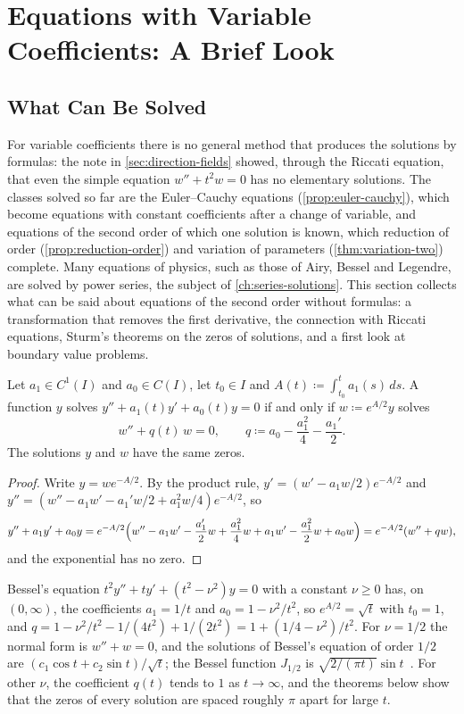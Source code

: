 \section{Equations with Variable Coefficients: A Brief Look}
\label{sec:variable-coefficients}

\subsection{What Can Be Solved}

For variable coefficients there is no general method that produces the solutions by formulas: the note in \cref{sec:direction-fields} showed, through the Riccati equation, that even the simple equation $w''+t^2w=0$ has no elementary solutions. The classes solved so far are the Euler--Cauchy equations (\cref{prop:euler-cauchy}), which become equations with constant coefficients after a change of variable, and equations of the second order of which one solution is known, which reduction of order (\cref{prop:reduction-order}) and variation of parameters (\cref{thm:variation-two}) complete. Many equations of physics, such as those of Airy, Bessel and Legendre, are solved by power series, the subject of \cref{ch:series-solutions}. This section collects what can be said about equations of the second order without formulas: a transformation that removes the first derivative, the connection with Riccati equations, Sturm's theorems on the zeros of solutions, and a first look at boundary value problems.

\begin{proposition}
\label{prop:normal-form}
Let $a_1\in C^1(I)$ and $a_0\in C(I)$, let $t_0\in I$ and $A(t)\coloneqq\int_{t_0}^ta_1(s)\,ds$. A function $y$ solves $y''+a_1(t)y'+a_0(t)y=0$ if and only if $w\coloneqq e^{A/2}y$ solves
\[
w''+q(t)\,w=0,\qquad q\coloneqq a_0-\frac{a_1^2}4-\frac{a_1'}2 .
\]
The solutions $y$ and $w$ have the same zeros.
\end{proposition}

\begin{proof}
Write $y=we^{-A/2}$. By the product rule, $y'=(w'-a_1w/2)e^{-A/2}$ and $y''=(w''-a_1w'-a_1'w/2+a_1^2w/4)e^{-A/2}$, so
\[
y''+a_1y'+a_0y=e^{-A/2}\Bigl(w''-a_1w'-\frac{a_1'}2w+\frac{a_1^2}4w+a_1w'-\frac{a_1^2}2w+a_0w\Bigr)=e^{-A/2}(w''+qw),
\]
and the exponential has no zero.
\end{proof}

Bessel's equation $t^2y''+ty'+(t^2-\nu^2)y=0$ with a constant $\nu\ge0$ has, on $(0,\infty)$, the coefficients $a_1=1/t$ and $a_0=1-\nu^2/t^2$, so $e^{A/2}=\sqrt t$ with $t_0=1$, and $q=1-\nu^2/t^2-1/(4t^2)+1/(2t^2)=1+(1/4-\nu^2)/t^2$. For $\nu=1/2$ the normal form is $w''+w=0$, and the solutions of Bessel's equation of order $1/2$ are $(c_1\cos t+c_2\sin t)/\sqrt t$; the Bessel function $J_{1/2}$ is $\sqrt{2/(\pi t)}\sin t$~\cite[Sect.~3.4]{watson1944}. For other $\nu$, the coefficient $q(t)$ tends to $1$ as $t\to\infty$, and the theorems below show that the zeros of every solution are spaced roughly $\pi$ apart for large $t$.

